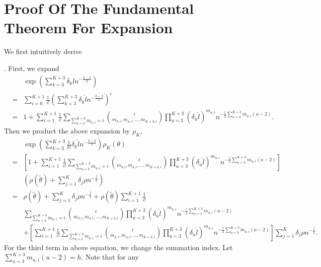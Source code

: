 \section{Proof Of The Fundamental Theorem For Expansion}\label{app-proof-fun-thm}

We first intuitively derive %
\begin{comment}
add expansion polynomial
\end{comment}
. First, we expand 
\begin{eqnarray*}
 &  & \exp\left(\sum_{k=3}^{K+3}\delta_{k}\hat{l}n^{-\frac{k-2}{2}}\right)\\
 & = & \sum_{i=0}^{K+1}\frac{1}{i!}\left(\sum_{k=3}^{K+3}\delta_{k}\hat{l}n^{-\frac{k-2}{2}}\right)^{i}\\
 & = & 1+\sum_{i=1}^{K+1}\frac{1}{i!}\sum_{\sum_{u=3}^{K+3}m_{u,i}=i}\binom{i}{m_{3,i},m_{4,i},\ldots,m_{K+3,i}}\prod_{u=3}^{K+3}\left(\delta_{u}\hat{l}\right)^{m_{u,i}}n^{-\frac{1}{2}\sum_{u=3}^{K+3}m_{u,i}\left(u-2\right)}.
\end{eqnarray*}
Then we product the above expansion by $\rho_{K}$, 
\begin{eqnarray*}
 &  & \exp\left(\sum_{k=3}^{K+3}\frac{1}{k!}\delta_{k}\hat{l}n^{-\frac{k-2}{2}}\right)\rho_{K}\left(\theta\right)\\
 & = & \left[1+\sum_{i=1}^{K+1}\frac{1}{i!}\sum_{\sum_{u=3}^{K+3}m_{u,i}=i}\binom{i}{m_{3,i},m_{4,i},\ldots,m_{K+3,i}}\prod_{u=3}^{K+3}\left(\delta_{u}\hat{l}\right)^{m_{u,i}}n^{-\frac{1}{2}\sum_{u=3}^{K+3}m_{u,i}\left(u-2\right)}\right]\\
 &  & \left(\rho\left(\tilde{\theta}\right)+\sum_{j=1}^{K}\delta_{j}\rho n^{-\frac{j}{2}}\right)\\
 & = & \rho\left(\tilde{\theta}\right)+\sum_{j=1}^{K}\delta_{j}\rho n^{-\frac{j}{2}}+\rho\left(\tilde{\theta}\right)\sum_{i=1}^{K+1}\frac{1}{i!}\\
 &  & \sum_{\sum_{u=3}^{K+3}m_{u,i}=i}\binom{i}{m_{3,i},m_{4,i},\ldots,m_{K+3,i}}\prod_{u=3}^{K+3}\left(\delta_{u}\hat{l}\right)^{m_{u,i}}n^{-\frac{1}{2}\sum_{u=3}^{K+3}m_{u,i}\left(u-2\right)}\\
 &  & +\left[\sum_{i=1}^{K+1}\frac{1}{i!}\sum_{\sum_{u=3}^{K+3}m_{u,i}=i}\binom{i}{m_{3,i},m_{4,i},\ldots,m_{K+3,i}}\prod_{u=3}^{K+3}\left(\delta_{u}\hat{l}\right)^{m_{u,i}}n^{-\frac{1}{2}\sum_{u=3}^{K+3}m_{u,i}\left(u-2\right)}\right]\sum_{j=1}^{K}\delta_{j}\rho n^{-\frac{j}{2}}.
\end{eqnarray*}
For the third term in above equation, we change the summation index.
Let $\sum_{u=3}^{K+3}m_{u,i}\left(u-2\right)=h$. Note that for any
